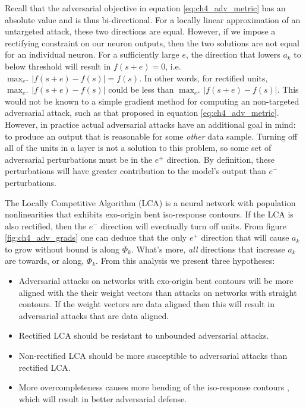 Recall that the adversarial objective in equation \ref{eq:ch4_adv_metric} has an absolute value and is thus bi-directional. For a locally linear approximation of an untargeted attack, these two directions are equal. However, if we impose a rectifying constraint on our neuron outputs, then the two solutions are not equal for an individual neuron. For a sufficiently large $e$, the direction that lowers $a_{k}$ to below threshold will result in $f(s+e)=0$, i.e. $\max_{e^{-}}|f(s+e)-f(s)| = f(s)$. In other words, for rectified units, $\max_{e^{-}}|f(s+e)-f(s)|$ could be less than $\max_{e^{+}}|f(s+e)-f(s)|$. This would not be known to a simple gradient method for computing an non-targeted adversarial attack, such as that proposed in equation \ref{eq:ch4_adv_metric}. However, in practice actual adversarial attacks have an additional goal in mind: to produce an output that is reasonable for some \emph{other} data sample. Turning off all of the units in a layer is not a solution to this problem, so some set of adversarial perturbations must be in the $e^{+}$ direction. By definition, these perturbations will have greater contribution to the model's output than $e^{-}$ perturbations.

The Locally Competitive Algorithm (LCA) is a neural network with population nonlinearities that exhibits exo-origin bent iso-response contours. If the LCA is also rectified, then the $e^{-}$ direction will eventually turn off units. From figure \ref{fig:ch4_adv_grads} one can deduce that the only $e^{+}$ direction that will cause $a_{k}$ to grow without bound is along $\Phi_{k}$. What's more, \emph{all} directions that increase $a_{k}$ are towards, or along, $\Phi_{k}$. From this analysis we present three hypotheses:

\begin{itemize}
  \item Adversarial attacks on networks with exo-origin bent contours will be more aligned with the their weight vectors than attacks on networks with straight contours. If the weight vectors are data aligned then this will result in adversarial attacks that are data aligned.
  \item Rectified LCA should be resistant to unbounded adversarial attacks.
  \item Non-rectified LCA should be more susceptible to adversarial attacks than rectified LCA.
  \item More overcompleteness causes more bending of the iso-response contours \parencite{golden2016conjectures}, which will result in better adversarial defense.
\end{itemize}

